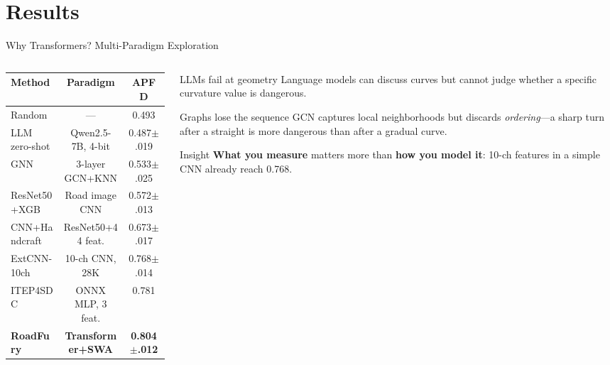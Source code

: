 \documentclass[aspectratio=169, 11pt]{beamer}
\begin{document}
\section{Results}

\begin{frame}{Why Transformers? Multi-Paradigm Exploration}
\begin{columns}[T]
\begin{column}{0.52\textwidth}
  \centering
  \renewcommand{\arraystretch}{1.2}
  \small
  \begin{tabular}{l c c}
    \toprule
    \textbf{Method} & \textbf{Paradigm} & \textbf{APFD} \\
    \midrule
    Random & --- & 0.493 \\
    LLM zero-shot & Qwen2.5-7B, 4-bit & 0.487{\tiny$\pm$.019} \\
    GNN & 3-layer GCN+KNN & 0.533{\tiny$\pm$.025} \\
    ResNet50+XGB & Road image CNN & 0.572{\tiny$\pm$.013} \\
    CNN+Handcraft & ResNet50+44 feat. & 0.673{\tiny$\pm$.017} \\
    ExtCNN-10ch & 10-ch CNN, 28K & 0.768{\tiny$\pm$.014} \\
    \midrule
    ITEP4SDC & ONNX MLP, 3 feat. & 0.781 \\
    \rowcolor{successgreen!20}
    \textbf{RoadFury} & \textbf{Transformer+SWA} & \textbf{0.804{\tiny$\pm$.012}} \\
    \bottomrule
  \end{tabular}
\end{column}
\begin{column}{0.45\textwidth}
  \begin{alertblock}{\small LLMs fail at geometry}
    \small Language models can discuss curves but cannot judge whether a specific curvature value is dangerous.
  \end{alertblock}
  
  \vspace{0.2em}
  \begin{block}{\small Graphs lose the sequence}
    \small GCN captures local neighborhoods but discards \emph{ordering}---a sharp turn after a straight is more dangerous than after a gradual curve.
  \end{block}
  
  \vspace{0.2em}
  \begin{exampleblock}{\small Insight}
    \small \textbf{What you measure} matters more than \textbf{how you model it}: 10-ch features in a simple CNN already reach 0.768.
  \end{exampleblock}
\end{column}
\end{columns}
\end{frame}
\end{document}
